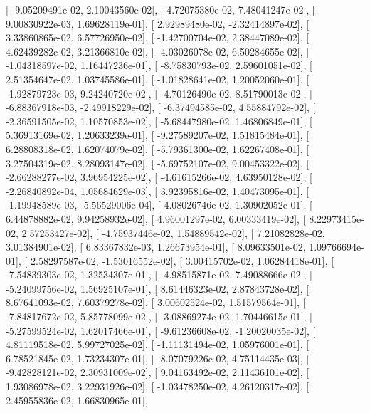 \documentclass{article}
\begin{document}
       [ -9.05209491e-02,   2.10043560e-02],
       [  4.72075380e-02,   7.48041247e-02],
       [  9.00830922e-03,   1.69628119e-01],
       [  2.92989480e-02,  -2.32414897e-02],
       [  3.33860865e-02,   6.57726950e-02],
       [ -1.42700704e-02,   2.38447089e-02],
       [  4.62439282e-02,   3.21366810e-02],
       [ -4.03026078e-02,   6.50284655e-02],
       [ -1.04318597e-02,   1.16447236e-01],
       [ -8.75830793e-02,   2.59601051e-02],
       [  2.51354647e-02,   1.03745586e-01],
       [ -1.01828641e-02,   1.20052060e-01],
       [ -1.92879723e-03,   9.24240720e-02],
       [ -4.70126490e-02,   8.51790013e-02],
       [ -6.88367918e-03,  -2.49918229e-02],
       [ -6.37494585e-02,   4.55884792e-02],
       [ -2.36591505e-02,   1.10570853e-02],
       [ -5.68447980e-02,   1.46806849e-01],
       [  5.36913169e-02,   1.20633239e-01],
       [ -9.27589207e-02,   1.51815484e-01],
       [  6.28808318e-02,   1.62074079e-02],
       [ -5.79361300e-02,   1.62267408e-01],
       [  3.27504319e-02,   8.28093147e-02],
       [ -5.69752107e-02,   9.00453322e-02],
       [ -2.66288277e-02,   3.96954225e-02],
       [ -4.61615266e-02,   4.63950128e-02],
       [ -2.26840892e-04,   1.05684629e-03],
       [  3.92395816e-02,   1.40473095e-01],
       [ -1.19948589e-03,  -5.56529006e-04],
       [  4.08026746e-02,   1.30902052e-01],
       [  6.44878882e-02,   9.94258932e-02],
       [  4.96001297e-02,   6.00333419e-02],
       [  8.22973415e-02,   2.57253427e-02],
       [ -4.75937446e-02,   1.54889542e-02],
       [  7.21082828e-02,   3.01384901e-02],
       [  6.83367832e-03,   1.26673954e-01],
       [  8.09633501e-02,   1.09766694e-01],
       [  2.58297587e-02,  -1.53016552e-02],
       [  3.00415702e-02,   1.06284418e-01],
       [ -7.54839303e-02,   1.32534307e-01],
       [ -4.98515871e-02,   7.49088666e-02],
       [ -5.24099756e-02,   1.56925107e-01],
       [  8.61446323e-02,   2.87843728e-02],
       [  8.67641093e-02,   7.60379278e-02],
       [  3.00602524e-02,   1.51579564e-01],
       [ -7.84817672e-02,   5.85778099e-02],
       [ -3.08869274e-02,   1.70446615e-01],
       [ -5.27599524e-02,   1.62017466e-01],
       [ -9.61236608e-02,  -1.20020035e-02],
       [  4.81119518e-02,   5.99727025e-02],
       [ -1.11131494e-02,   1.05976001e-01],
       [  6.78521845e-02,   1.73234307e-01],
       [ -8.07079226e-02,   4.75114435e-03],
       [ -9.42828121e-02,   2.30931009e-02],
       [  9.04163492e-02,   2.11436101e-02],
       [  1.93086978e-02,   3.22931926e-02],
       [ -1.03478250e-02,   4.26120317e-02],
       [  2.45955836e-02,   1.66830965e-01],
\end{document}
